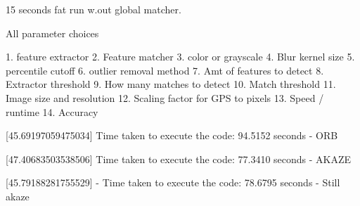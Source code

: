 15 seconds fat run w.out global matcher. 

All parameter choices

1. feature extractor
2. Feature matcher
3. color or grayscale
4. Blur kernel size
5. percentile cutoff
6. outlier removal method
7. Amt of features to detect
8. Extractor threshold
9. How many matches to detect
10. Match threshold
11. Image size and resolution
12. Scaling factor for GPS to pixels
13. Speed / runtime
14. Accuracy   



[45.69197059475034]
Time taken to execute the code: 94.5152 seconds - ORB


[47.40683503538506]
Time taken to execute the code: 77.3410 seconds - AKAZE



[45.79188281755529] - 
Time taken to execute the code: 78.6795 seconds - Still akaze 